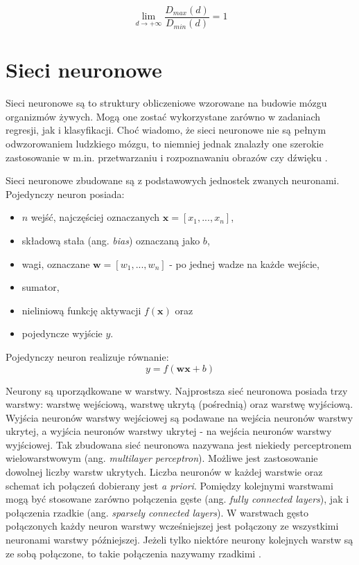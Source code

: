 \documentclass[notitlepage]{report}
\begin{document}
\begin{equation}
\lim\limits_{d\rightarrow+\infty} \frac{D_{max}(d)}{D_{min}(d)} = 1
\end{equation}






\section{Sieci neuronowe}
Sieci neuronowe są to struktury obliczeniowe wzorowane na budowie mózgu organizmów żywych. Mogą one zostać wykorzystane zarówno w zadaniach regresji, jak i klasyfikacji. Choć wiadomo, że sieci neuronowe nie są pełnym odwzorowaniem ludzkiego mózgu, to niemniej jednak znalazły one szerokie zastosowanie w m.in. przetwarzaniu i rozpoznawaniu obrazów czy dźwięku \cite{szegedy} \cite{purwins}.

Sieci neuronowe zbudowane są z podstawowych jednostek zwanych neuronami. Pojedynczy neuron posiada:
\begin{itemize}
	\item $n$ wejść, najczęściej oznaczanych $\mathbf{x} = [x_{1}, ... ,x_{n}]$,
	\item składową stała (ang. \textit{bias}) oznaczaną jako $b$,
	\item wagi, oznaczane $\mathbf{w} = [w_{1}, ..., w_{n}]$ - po jednej wadze na każde wejście,
	\item sumator,
	\item nieliniową funkcję aktywacji $f(\mathbf{x})$ oraz
	\item pojedyncze wyjście $y$.
\end{itemize}
Pojedynczy neuron realizuje równanie:
\begin{equation}
y = f(\mathbf{wx} + b)
\end{equation}

Neurony są uporządkowane w warstwy. Najprostsza sieć neuronowa posiada trzy warstwy: warstwę wejściową, warstwę ukrytą (pośrednią) oraz warstwę wyjściową. Wyjścia neuronów warstwy wejściowej są podawane na wejścia neuronów warstwy ukrytej, a wyjścia neuronów warstwy ukrytej - na wejścia neuronów warstwy wyjściowej. Tak zbudowana sieć neuronowa nazywana jest niekiedy perceptronem wielowarstwowym (ang. \textit{multilayer perceptron}). Możliwe jest zastosowanie dowolnej liczby warstw ukrytych. Liczba neuronów w każdej warstwie oraz schemat ich połączeń dobierany jest \textit{a priori}. Pomiędzy kolejnymi warstwami mogą być stosowane zarówno połączenia gęste  (ang. \textit{fully connected layers}), jak i połączenia rzadkie (ang. \textit{sparsely connected layers}). W warstwach gęsto połączonych każdy neuron warstwy wcześniejszej jest połączony ze wszystkimi neuronami warstwy późniejszej. Jeżeli tylko niektóre neurony kolejnych warstw są ze sobą połączone, to takie połączenia nazywamy rzadkimi \cite{haykin} \cite{sze}.
\end{document}
